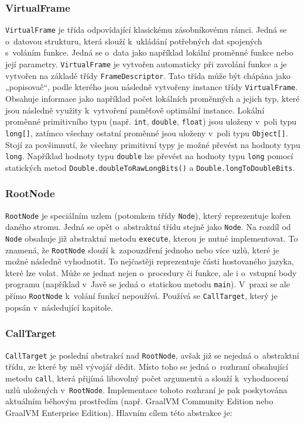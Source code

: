 \documentclass[
  master,
  biblatex,
  figures=true,
  theorems,
  sourcecodes,
  glossaries,
  index
]{kidiplom}
\begin{document}
\subsubsection{VirtualFrame}
\label{chapter-virtualFrame}
\texttt{VirtualFrame} je třída odpovídající klasickému zásobníkovému rámci. Jedná se o~datovou strukturu, která slouží k~ukládání potřebných dat spojených s~voláním funkce. Jedná se o~data jako například lokální proměnné funkce nebo její parametry. \texttt{VirtualFrame} je vytvořen automaticky při zavolání funkce a je vytvořen na základě třídy  \texttt{FrameDescriptor}. Tato třída může být chápána jako „popisovač“, podle kterého jsou následně vytvořeny instance třídy \texttt{Virtual\-Frame}. Obsahuje informace jako například počet lokálních proměnných a jejich typ, které jsou následně využity k~vytvoření paměťově optimální instance. Lokální proměnné primitivního typu (např. \texttt{int}, \texttt{double}, \texttt{float}) jsou uloženy v~poli typu \texttt{long[]}, zatímco všechny ostatní proměnné jsou uloženy v~poli typu \texttt{Object[]}. Stojí za povšimnutí, že všechny primitivní typy je možné převést na hodnoty typu \texttt{long}. Například hodnoty typu \texttt{double} lze převést na hodnoty typu \texttt{long} pomocí statických metod \texttt{Double.doubleToRawLongBits()} a \texttt{Double.longToDoubleBits}. \cite{truffle-clojure}



\subsubsection{RootNode}
\texttt{RootNode} je speciálním uzlem (potomkem třídy \texttt{Node}), který reprezentuje kořen daného stromu. Jedná se opět o~abstraktní třídu stejně jako \texttt{Node}. Na rozdíl od \texttt{Node} obsahuje již abstraktní metodu \texttt{execute}, kterou je nutné implementovat. To znamená, že \texttt{RootNode} slouží k~zapouzdření jednoho nebo více uzlů, které je možné následně vyhodnotit. To nejčastěji reprezentuje části hostovaného jazyka, které lze volat. Může se jednat nejen o~procedury či funkce, ale i o~vstupní body programu (například v~Javě se jedná o~statickou metodu \texttt{main}). V~praxi se ale přímo \texttt{RootNode} k~volání funkcí nepoužívá. Používá se \texttt{CallTarget}, který je popsán v~následující kapitole. 


\subsubsection{CallTarget}
\label{chapter-callTarget}
\texttt{CallTarget} je poslední abstrakcí nad \texttt{RootNode}, avšak již se nejedná o~abstraktní třídu, ze které by měl vývojář dědit. Místo toho se jedná o~rozhraní obsahující metodu \texttt{call}, která přijímá libovolný počet argumentů a slouží k~vyhodnocení uzlů uložených v~\texttt{RootNode}. Implementace tohoto rozhraní je pak poskytována aktuálním běhovým prostředím (např. GraalVM Community Edition nebo GraalVM Enterprise Edition). Hlavním cílem této abstrakce je:
\end{document}

